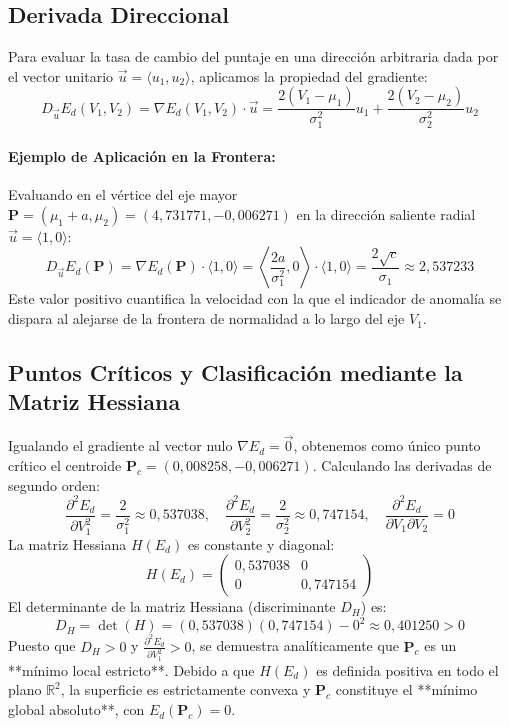 \documentclass[12pt,a4paper]{article}
\begin{document}
\subsection{Derivada Direccional}
Para evaluar la tasa de cambio del puntaje en una dirección arbitraria dada por el vector unitario $\vec{u} = \langle u_1, u_2 \rangle$, aplicamos la propiedad del gradiente:
\begin{equation}
D_{\vec{u}} E_d(V_1, V_2) = \nabla E_d(V_1, V_2) \cdot \vec{u} = \frac{2(V_1 - \mu_1)}{\sigma_1^2} u_1 + \frac{2(V_2 - \mu_2)}{\sigma_2^2} u_2
\end{equation}
\paragraph{Ejemplo de Aplicación en la Frontera:} Evaluando en el vértice del eje mayor $\mathbf{P} = (\mu_1 + a, \mu_2) = (4{,}731771, -0{,}006271)$ en la dirección saliente radial $\vec{u} = \langle 1, 0 \rangle$:
\begin{equation}
D_{\vec{u}} E_d(\mathbf{P}) = \nabla E_d(\mathbf{P}) \cdot \langle 1, 0 \rangle = \left\langle \frac{2 a}{\sigma_1^2}, 0 \right\rangle \cdot \langle 1, 0 \rangle = \frac{2 \sqrt{c}}{\sigma_1} \approx 2{,}537233
\end{equation}
Este valor positivo cuantifica la velocidad con la que el indicador de anomalía se dispara al alejarse de la frontera de normalidad a lo largo del eje $V_1$.

\subsection{Puntos Críticos y Clasificación mediante la Matriz Hessiana}
Igualando el gradiente al vector nulo $\nabla E_d = \vec{0}$, obtenemos como único punto crítico el centroide $\mathbf{P}_c = (0{,}008258, -0{,}006271)$. Calculando las derivadas de segundo orden:
\begin{equation}
\frac{\partial^2 E_d}{\partial V_1^2} = \frac{2}{\sigma_1^2} \approx 0{,}537038, \quad \frac{\partial^2 E_d}{\partial V_2^2} = \frac{2}{\sigma_2^2} \approx 0{,}747154, \quad \frac{\partial^2 E_d}{\partial V_1 \partial V_2} = 0
\end{equation}
La matriz Hessiana $H(E_d)$ es constante y diagonal:
\begin{equation}
H(E_d) = \begin{pmatrix} 0{,}537038 & 0 \\ 0 & 0{,}747154 \end{pmatrix}
\end{equation}
El determinante de la matriz Hessiana (discriminante $D_H$) es:
\begin{equation}
D_H = \det(H) = (0{,}537038)(0{,}747154) - 0^2 \approx 0{,}401250 > 0
\end{equation}
Puesto que $D_H > 0$ y $\frac{\partial^2 E_d}{\partial V_1^2} > 0$, se demuestra analíticamente que $\mathbf{P}_c$ es un **mínimo local estricto**. Debido a que $H(E_d)$ es definida positiva en todo el plano $\mathbb{R}^2$, la superficie es estrictamente convexa y $\mathbf{P}_c$ constituye el **mínimo global absoluto**, con $E_d(\mathbf{P}_c) = 0$.
\end{document}
